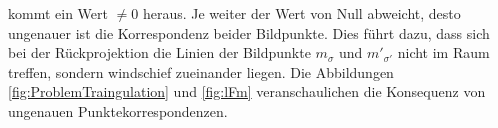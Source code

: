 kommt ein Wert $\neq 0$ heraus. Je weiter der Wert von Null abweicht, desto ungenauer ist die Korrespondenz beider Bildpunkte. Dies führt dazu, dass sich bei der Rückprojektion die Linien der Bildpunkte $m_\sigma$ und $m'_{\sigma'}$ nicht im Raum treffen, sondern windschief zueinander liegen. Die Abbildungen \ref{fig:ProblemTraingulation} und \ref{fig:lFm} veranschaulichen die Konsequenz von ungenauen Punktekorrespondenzen.
%
%
%
%

